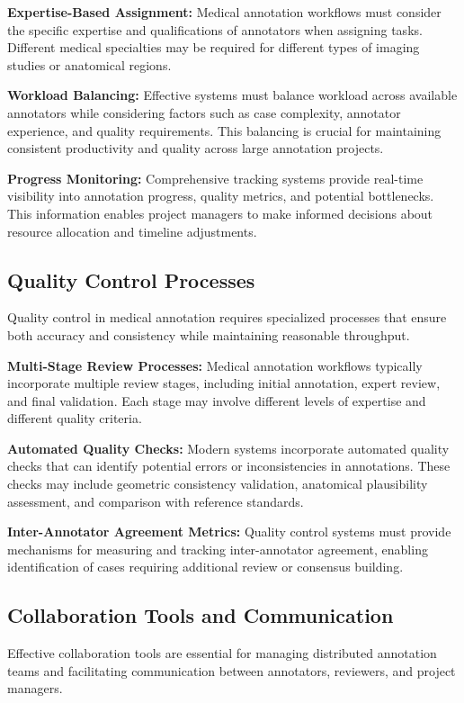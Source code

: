 \textbf{Expertise-Based Assignment:} Medical annotation workflows must consider the specific expertise and qualifications of annotators when assigning tasks. Different medical specialties may be required for different types of imaging studies or anatomical regions.

\textbf{Workload Balancing:} Effective systems must balance workload across available annotators while considering factors such as case complexity, annotator experience, and quality requirements. This balancing is crucial for maintaining consistent productivity and quality across large annotation projects.

\textbf{Progress Monitoring:} Comprehensive tracking systems provide real-time visibility into annotation progress, quality metrics, and potential bottlenecks. This information enables project managers to make informed decisions about resource allocation and timeline adjustments.

\subsection{Quality Control Processes}

Quality control in medical annotation requires specialized processes that ensure both accuracy and consistency while maintaining reasonable throughput.

\textbf{Multi-Stage Review Processes:} Medical annotation workflows typically incorporate multiple review stages, including initial annotation, expert review, and final validation. Each stage may involve different levels of expertise and different quality criteria.

\textbf{Automated Quality Checks:} Modern systems incorporate automated quality checks that can identify potential errors or inconsistencies in annotations. These checks may include geometric consistency validation, anatomical plausibility assessment, and comparison with reference standards.

\textbf{Inter-Annotator Agreement Metrics:} Quality control systems must provide mechanisms for measuring and tracking inter-annotator agreement, enabling identification of cases requiring additional review or consensus building.

\subsection{Collaboration Tools and Communication}

Effective collaboration tools are essential for managing distributed annotation teams and facilitating communication between annotators, reviewers, and project managers.


